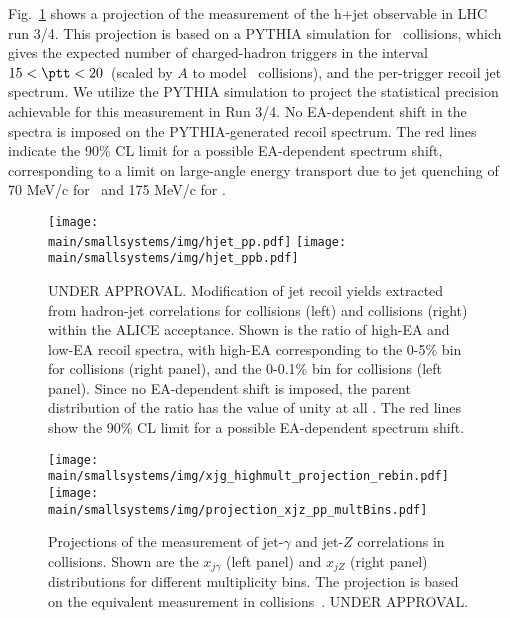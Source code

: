 \documentclass[../report.tex]{subfiles}
\providecommand{\main}{..}
\begin{document}
Fig.~\ref{fig:smallsystems_energyloss_hjet} shows a projection of the measurement of the h+jet observable in LHC run 3/4.
This projection is based on a PYTHIA simulation for \pp\ collisions, which gives the expected number of charged-hadron triggers in the interval $15<\ptt<20$~\UGeV (scaled by $A$ to model \pPb\ collisions), and the per-trigger recoil jet spectrum.
We utilize the PYTHIA simulation to project the statistical precision achievable for this measurement in Run 3/4. No EA-dependent shift in the spectra is imposed on the PYTHIA-generated recoil spectrum. %
The red lines indicate the 90\% CL limit for a possible EA-dependent spectrum shift, corresponding to a limit on large-angle energy transport due to jet quenching of 70 MeV/c for \pPb\ and 175 MeV/c for \pp.

\begin{figure}[ht]
\centering
\texttt{[image: \\main/smallsystems/img/hjet\_pp.pdf]}
\hfill
\texttt{[image: \\main/smallsystems/img/hjet\_ppb.pdf]}
\caption{UNDER APPROVAL. Modification of jet recoil yields extracted from hadron-jet correlations for \pp{} collisions (left) and \pPb collisions (right) within the ALICE acceptance. Shown is the ratio  of high-EA and low-EA recoil spectra, with high-EA corresponding to the 0-5\% bin for \pPb collisions (right panel), and the 0-0.1\% bin for \pp collisions (left panel). Since no EA-dependent shift is imposed, the parent distribution of the ratio has the value of unity at all \pT. The red lines show the 90\% CL limit for a possible EA-dependent spectrum shift.}
\label{fig:smallsystems_energyloss_hjet}
\end{figure}

\begin{figure}[ht]
\centering
\texttt{[image: \\main/smallsystems/img/xjg\_highmult\_projection\_rebin.pdf]}
\hfill
\texttt{[image: \\main/smallsystems/img/projection\_xjz\_pp\_multBins.pdf]}
\caption{Projections of the measurement of jet-$\gamma$ and jet-$Z$ correlations in \pp collisions. Shown are the $x_{j\gamma}$ (left panel) and $x_{jZ}$ (right panel) distributions for different multiplicity bins. The projection is based on the equivalent measurement in \pPb collisions~\cite{}. UNDER APPROVAL.}
\label{fig:smallsystems_energyloss_xjg}
\end{figure}
\end{document}
